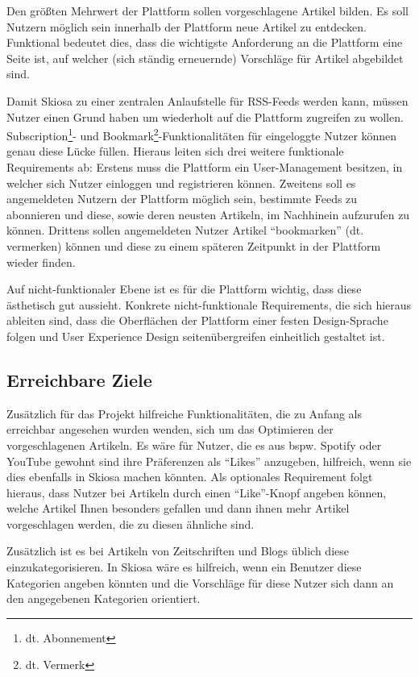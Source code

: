 Den größten Mehrwert der Plattform sollen vorgeschlagene Artikel bilden.
Es soll Nutzern möglich sein innerhalb der Plattform neue Artikel zu entdecken.
Funktional bedeutet dies, dass die wichtigste Anforderung an die Plattform eine Seite ist, auf welcher (sich ständig erneuernde) Vorschläge für Artikel abgebildet sind.

Damit Skiosa zu einer zentralen Anlaufstelle für RSS-Feeds werden kann, müssen Nutzer einen Grund haben um wiederholt auf die Plattform zugreifen zu wollen.
Subscription\footnote{dt. Abonnement}- und Bookmark\footnote{dt. Vermerk}-Funktionalitäten für eingeloggte Nutzer können genau diese Lücke füllen.
Hieraus leiten sich drei weitere funktionale Requirements ab:
Erstens muss die Plattform ein User-Management besitzen, in welcher sich Nutzer einloggen und registrieren können.
Zweitens soll es angemeldeten Nutzern der Plattform möglich sein, bestimmte Feeds zu abonnieren und diese, sowie deren neusten Artikeln, im Nachhinein aufzurufen zu können.
Drittens sollen angemeldeten Nutzer Artikel \enquote{bookmarken} (dt. vermerken) können und diese zu einem späteren Zeitpunkt in der Plattform wieder finden.

Auf nicht-funktionaler Ebene ist es für die Plattform wichtig, dass diese ästhetisch gut aussieht.
Konkrete nicht-funktionale Requirements, die sich hieraus ableiten sind, dass die Oberflächen der Plattform einer festen Design-Sprache folgen und User Experience Design seitenübergreifen einheitlich gestaltet ist.

\subsection{Erreichbare Ziele}
Zusätzlich für das Projekt hilfreiche Funktionalitäten, die zu Anfang als erreichbar angesehen wurden wenden, sich um das Optimieren der vorgeschlagenen Artikeln.
Es wäre für Nutzer, die es aus bspw. Spotify oder YouTube gewohnt sind ihre Präferenzen als \enquote{Likes} anzugeben, hilfreich, wenn sie dies ebenfalls in Skiosa machen könnten.
Als optionales Requirement folgt hieraus, dass Nutzer bei Artikeln durch einen \enquote{Like}-Knopf angeben können, welche Artikel Ihnen besonders gefallen und dann ihnen mehr Artikel vorgeschlagen werden, die zu diesen ähnliche sind.

Zusätzlich ist es bei Artikeln von Zeitschriften und Blogs üblich diese einzukategorisieren.
In Skiosa wäre es hilfreich, wenn ein Benutzer diese Kategorien angeben könnten und die Vorschläge für diese Nutzer sich dann an den angegebenen Kategorien orientiert.

